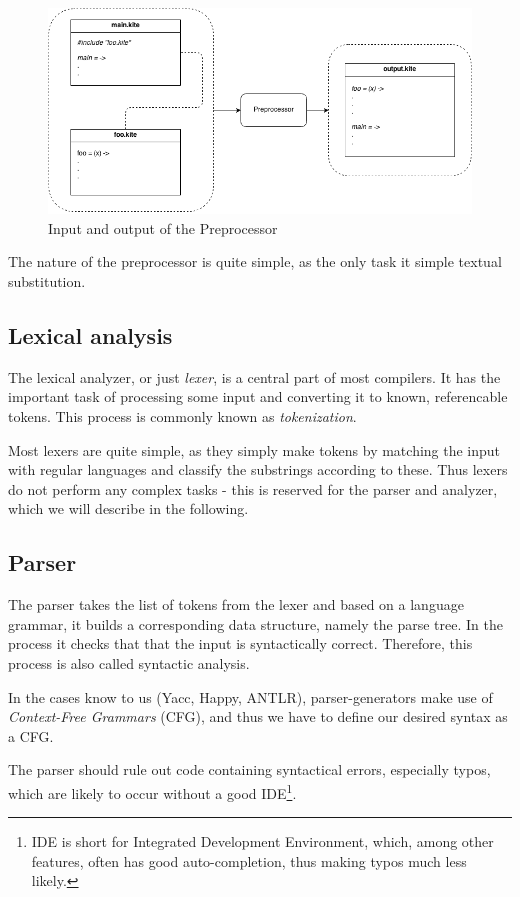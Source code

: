 \begin{figure}[H]
  \centering
  \includegraphics[scale=0.45]{images/preprocessor.png}
  \caption{Input and output of the Preprocessor}
\label{fig:preprocessor}
\end{figure}

The nature of the preprocessor is quite simple, as the only task it simple textual substitution.


\subsection{Lexical analysis}
The lexical analyzer, or just \emph{lexer}, is a central part of most compilers. It has the important task of processing some input and converting it to known, referencable tokens. This process is commonly known as \emph{tokenization}.

Most lexers are quite simple, as they simply make tokens by matching the input with regular languages and classify the substrings according to these. Thus lexers do not perform any complex tasks - this is reserved for the parser and analyzer, which we will describe in the following.


\subsection{Parser}
The parser takes the list of tokens from the lexer and based on a language grammar, it builds a corresponding data structure, namely the parse tree. In the process it checks that that the input is syntactically correct. Therefore, this process is also called syntactic analysis.

In the cases know to us (Yacc, Happy, ANTLR), parser-generators make use of \emph{Context-Free Grammars} (CFG), and thus we have to define our desired syntax as a CFG.

The parser should rule out code containing syntactical errors, especially typos, which are likely to occur without a good IDE\footnote{IDE is short for Integrated Development Environment, which, among other features, often has good auto-completion, thus making typos much less likely.}.


